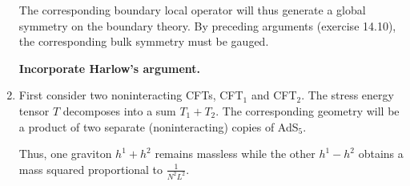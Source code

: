 \documentclass[11pt, class=article, crop=false]{standalone}
\begin{document}
\begin{enumerate}
	The corresponding boundary local operator will thus generate a global symmetry on the boundary theory. By preceding arguments (exercise 14.10), the corresponding bulk symmetry must be gauged. 
	
	\textbf{Incorporate Harlow's argument.}
	
	\item First consider two noninteracting CFTs, CFT$_1$ and CFT$_2$. The stress energy tensor $T$ decomposes into a sum  $T_1 + T_2$. The corresponding geometry will be a product of two separate (noninteracting) copies of AdS$_5$.
	
	Thus, one graviton $h^1 + h^2$ remains massless while the other $h^1 - h^2$ obtains a mass squared proportional to $\frac{1}{N^2 L^2}$.
	
	
	
\end{enumerate}

\end{document}
